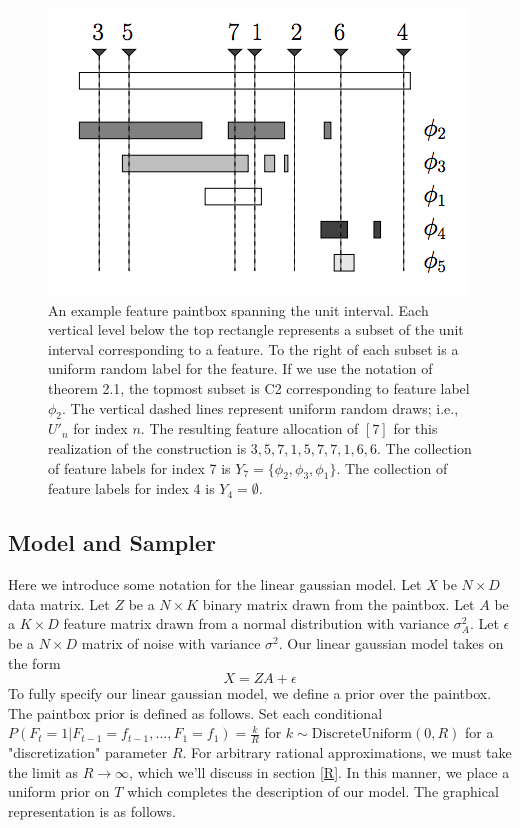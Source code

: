 \documentclass{article}
\begin{document}
\begin{figure}[brod_paint]
\vskip 0.2in
\begin{center}
\centerline{\includegraphics[width=\columnwidth]{brod_paint}}
\caption{\cite{BJP13}  An example feature paintbox spanning the unit interval. Each vertical level below the top rectangle represents a subset of
the unit interval corresponding to a feature. To the right of each subset is
a uniform random label for the feature. If we use the notation of theorem 2.1, the topmost subset is C2 corresponding to feature label $\phi_2$. The
vertical dashed lines represent uniform random draws; i.e., $U′_n$
for index $n$.
The resulting feature allocation of $[7]$ for this realization of the construction is
${{3, 5, 7, 1}, {5, 7}, {7, 1}, {6}, {6}}$. The collection of feature labels for index 7
is $Y_7 = \{\phi_2, \phi_3, \phi_1\}$. The collection of feature labels for index 4 is $Y_4 = \emptyset$. } 
\label{brod_paint}
\end{center}
\vskip -0.2in
\end{figure}


\subsection{Model and Sampler} \label{model}
Here we introduce some notation for the linear gaussian model.  Let $X$ be $N \times D$ data matrix.  Let $Z$ be a $N \times K$ binary matrix drawn from the paintbox.  Let $A$ be a $K \times D$ feature matrix drawn from a normal distribution with variance $\sigma_A^2$.  Let $\epsilon$ be a $N \times D$ matrix of noise with variance $\sigma^2$. Our linear gaussian model takes on the form 
\begin{equation}
X = ZA + \epsilon
\end{equation}
To fully specify our linear gaussian model, we define a prior over the paintbox. The paintbox prior is defined as follows.  Set each conditional $P(F_t = 1|F_{t-1}=f_{t-1},...,F_1=f_1) = \frac
{k}{R}$ for $k \sim \text{DiscreteUniform}(0,R)$ for a "discretization" parameter $R$.  For arbitrary rational approximations, we must take the limit as $R \rightarrow \infty$, which we'll discuss in section \ref{R}.  In this manner, we place a uniform prior on $T$ which completes the description of our model.  The graphical representation is as follows.  
\end{document}
